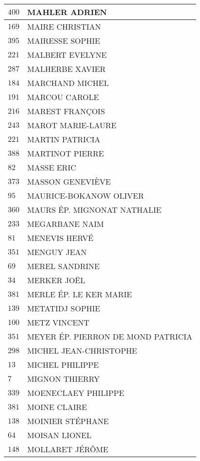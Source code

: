 \begin{xltabular}{\linewidth}{|l|X|}
    \hline
    $400$ & MAHLER ADRIEN \\
    \hline
    $169$ & MAIRE CHRISTIAN \\
    \hline
    $395$ & MAIRESSE SOPHIE \\
    \hline
    $221$ & MALBERT EVELYNE \\
    \hline
    $287$ & MALHERBE XAVIER \\
    \hline
    $184$ & MARCHAND MICHEL \\
    \hline
    $191$ & MARCOU CAROLE \\
    \hline
    $216$ & MAREST FRANÇOIS \\
    \hline
    $243$ & MAROT MARIE-LAURE \\
    \hline
    $221$ & MARTIN PATRICIA \\
    \hline
    $388$ & MARTINOT PIERRE \\
    \hline
    $82$ & MASSE ERIC \\
    \hline
    $373$ & MASSON GENEVIÈVE \\
    \hline
    $95$ & MAURICE-BOKANOW OLIVER \\
    \hline
    $360$ & MAURS ÉP. MIGNONAT NATHALIE \\
    \hline
    $233$ & MEGARBANE NAIM \\
    \hline
    $81$ & MENEVIS HERVÉ \\
    \hline
    $351$ & MENGUY JEAN \\
    \hline
    $69$ & MEREL SANDRINE \\
    \hline
    $34$ & MERKER JOËL \\
    \hline
    $381$ & MERLE ÉP. LE KER MARIE \\
    \hline
    $139$ & METATIDJ SOPHIE \\
    \hline
    $100$ & METZ VINCENT \\
    \hline
    $351$ & MEYER ÉP. PIERRON DE MOND PATRICIA \\
    \hline
    $298$ & MICHEL JEAN-CHRISTOPHE \\
    \hline
    $13$ & MICHEL PHILIPPE \\
    \hline
    $7$ & MIGNON THIERRY \\
    \hline
    $339$ & MOENECLAEY PHILIPPE \\
    \hline
    $381$ & MOINE CLAIRE \\
    \hline
    $138$ & MOINIER STÉPHANE \\
    \hline
    $64$ & MOISAN LIONEL \\
    \hline
    $148$ & MOLLARET JÉRÔME \\

\end{xltabular}
